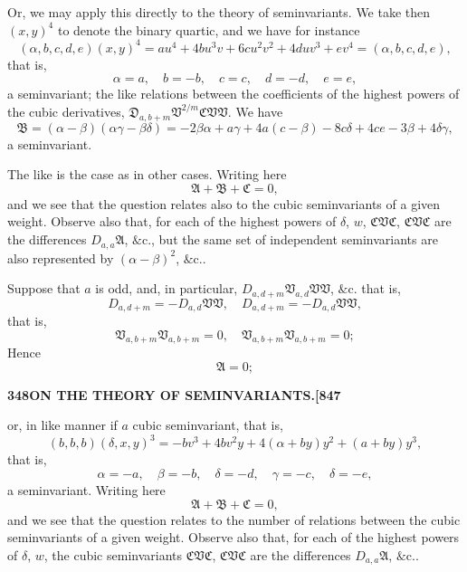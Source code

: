 \documentclass[12pt,a4paper]{article}
\theoremstyle{definition}
\begin{document}
Or, we may apply this directly to the theory of seminvariants. We take then $(x, y)^4$ to denote the binary quartic, and we have for instance
\[
(\alpha, b, c, d, e)(x, y)^4 = au^4 + 4bu^3v + 6cu^2v^2 + 4duv^3 + ev^4 = (\alpha, b, c, d, e),
\]
that is,
\[
\alpha = a, \quad b = -b, \quad c = c, \quad d = -d, \quad e = e,
\]
a seminvariant; the like relations between the coefficients of the highest powers of the cubic derivatives, $\mathfrak{D}_{a,b+m}\mathfrak{V}^{2/m}\mathfrak{C}\mathfrak{V}\mathfrak{V}$. We have
\[
\mathfrak{B} = (\alpha - \beta)(\alpha\gamma - \beta\delta) = -2\beta\alpha + a\gamma + 4a(c - \beta) - 8c\delta + 4ce - 3\beta + 4\delta\gamma,
\]
a seminvariant.

The like is the case as in other cases. Writing here
\[
\mathfrak{A} + \mathfrak{B} + \mathfrak{C} = 0,
\]
and we see that the question relates also to the cubic seminvariants of a given weight. Observe also that, for each of the highest powers of $\delta$, $w$, $\mathfrak{C}\mathfrak{V}\mathfrak{C}$, $\mathfrak{C}\mathfrak{V}\mathfrak{C}$ are the differences $D_{a,a}\mathfrak{A}$, $\&\text{c.}$, but the same set of independent seminvariants are also represented by $(\alpha - \beta)^2$, $\&\text{c.}$.

Suppose that $a$ is odd, and, in particular, $D_{a,d+m}\mathfrak{V}_{a,d}\mathfrak{V}\mathfrak{V}$, $\&\text{c.}$ that is,
\[
D_{a,d+m} = -D_{a,d}\mathfrak{V}\mathfrak{V}, \quad D_{a,d+m} = -D_{a,d}\mathfrak{V}\mathfrak{V},
\]
that is,
\[
\mathfrak{V}_{a,b+m}\mathfrak{V}_{a,b+m} = 0, \quad \mathfrak{V}_{a,b+m}\mathfrak{V}_{a,b+m} = 0;
\]
Hence
\[
\mathfrak{A} = 0;
\]

\newpage
\setcounter{page}{348}

\noindent\textbf{348}\hfill\textbf{ON THE THEORY OF SEMINVARIANTS.}\hfill\textbf{[847}

\bigskip

\noindent or, in like manner if $a$ cubic seminvariant, that is,
\[
(b, b, b)(\delta, x, y)^3 = -bv^3 + 4bv^2y + 4(\alpha + by)y^2 + (a + by)y^3,
\]
that is,
\[
\alpha = -a, \quad \beta = -b, \quad \delta = -d, \quad \gamma = -c, \quad \delta = -e,
\]
a seminvariant. Writing here
\[
\mathfrak{A} + \mathfrak{B} + \mathfrak{C} = 0,
\]
and we see that the question relates to the number of relations between the cubic seminvariants of a given weight. Observe also that, for each of the highest powers of $\delta$, $w$, the cubic seminvariants $\mathfrak{C}\mathfrak{V}\mathfrak{C}$, $\mathfrak{C}\mathfrak{V}\mathfrak{C}$ are the differences $D_{a,a}\mathfrak{A}$, $\&\text{c.}$.
\end{document}
